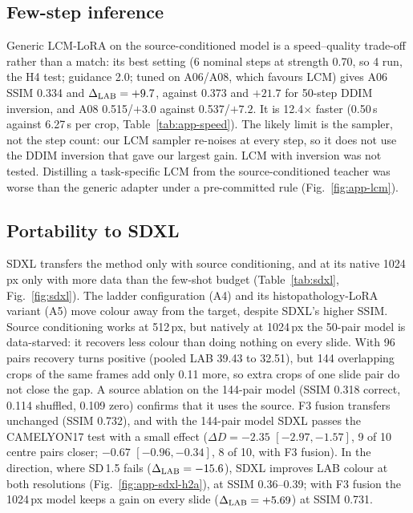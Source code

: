 \subsection{Few-step inference}
Generic LCM-LoRA on the source-conditioned model is a speed--quality trade-off rather than a match: its best
setting (6 nominal steps at strength 0.70, so 4 run, the H4 test; guidance 2.0; tuned on A06/A08, which favours LCM) gives A06 SSIM 0.334 and $\Delta_{\mathrm{LAB}}=+9.7$, against 0.373 and
$+21.7$ for 50-step DDIM inversion, and A08 0.515/$+3.0$ against 0.537/$+7.2$. It is 12.4$\times$ faster
(0.50\,s against 6.27\,s per crop, Table~\ref{tab:app-speed}). The likely limit is the sampler, not the step
count: our LCM sampler re-noises at every step, so it does not use the DDIM inversion that gave our largest gain. LCM with inversion was not tested. Distilling a task-specific
LCM from the source-conditioned teacher was worse than the generic adapter under a pre-committed rule (Fig.~\ref{fig:app-lcm}).

\subsection{Portability to SDXL}
SDXL transfers the method only with source conditioning, and at its native 1024\,px only with more data than the few-shot budget
(Table~\ref{tab:sdxl}, Fig.~\ref{fig:sdxl}). The ladder configuration (A4) and its histopathology-LoRA variant (A5) move colour away from
the target, despite SDXL's higher SSIM. Source conditioning works at 512\,px, but natively at 1024\,px the
50-pair model is data-starved: it recovers less colour than doing nothing on every slide. With 96 pairs
recovery turns positive (pooled LAB 39.43 to 32.51), but 144 overlapping crops of the same frames add only
0.11 more, so extra crops of one slide pair do not close the gap. A source ablation on
the 144-pair model (SSIM 0.318 correct, 0.114 shuffled, 0.109 zero) confirms that it uses the source. F3
fusion transfers unchanged (SSIM 0.732), and with the 144-pair model SDXL passes the CAMELYON17 test with a
small effect ($\Delta D=-2.35$ $[-2.97, -1.57]$,
9 of 10 centre pairs closer; $-0.67$ $[-0.96, -0.34]$, 8 of 10, with F3 fusion). In
the \HtoA{} direction, where SD\,1.5 fails ($\Delta_{\mathrm{LAB}}=-15.6$), SDXL improves LAB colour at both resolutions (Fig.~\ref{fig:app-sdxl-h2a}), at SSIM 0.36--0.39; with F3 fusion the 1024\,px model keeps a
gain on every slide ($\Delta_{\mathrm{LAB}}=+5.69$) at SSIM 0.731.

